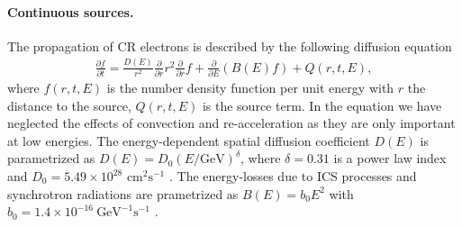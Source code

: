 \documentclass[aps,prl,twocolumn,a4paper]{revtex4}
\begin{document}
\paragraph{\bf Continuous  sources.}
The propagation of  CR electrons  is described by  
the following diffusion equation
\cite{
	Ginzburg%
}
\begin{align}\label{eq:propagation}
\frac{\partial f}{\partial t}  =
\frac{D(E)}{r^{2}}\frac{\partial}{\partial r}r^{2}\frac{\partial}{\partial r} f
+\frac{\partial}{\partial E}\left(B(E)f\right)
+Q(r,t,E),
\end{align}
where $f(r,t,E)$ is the number density function per unit energy
with $r$ the distance to the source,
$Q(r,t,E)$ is the source term.
In the  equation we have neglected the effects of 
convection and re-acceleration
as they are only important at low energies. %
The energy-dependent spatial diffusion coefficient $D(E)$  is parametrized as
$D(E)=D_{0}(E/\mbox{GeV})^{\delta}$,
where $\delta=0.31$ is a power law index and  
$D_{0}=5.49\times 10^{28}\mbox{ cm}^{2}\mbox{s}^{-1}$ %
\cite{
	Trotta:2010mx%
}. 
The energy-losses due to ICS processes and synchrotron radiations  are prametrized as 
$B(E)=b_{0} E^{2}$ with
$b_{0}=1.4\times10^{-16}~\mbox{GeV}^{-1}\mbox{s}^{-1}$
\cite{
	Linden:2013mqa%
}.
\end{document}

